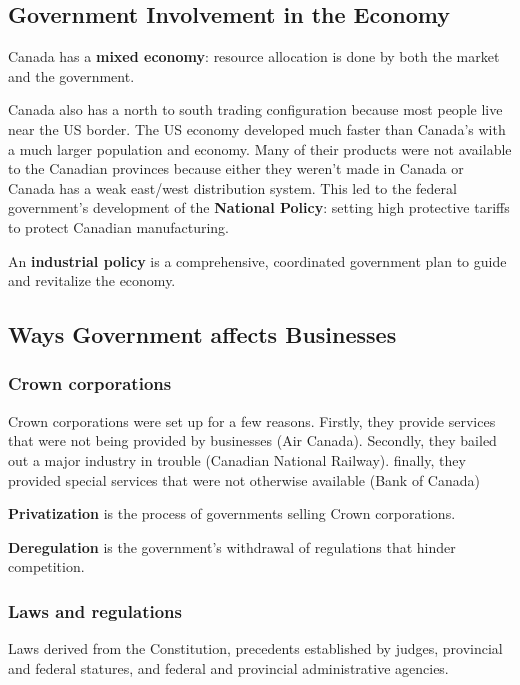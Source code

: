 \documentclass[english, 12pt]{article}
\begin{document}
\subsection{Government Involvement in the Economy}
\begin{defn}
Canada has a \textbf{mixed economy}: resource allocation is done by both the market and the government.
\end{defn}
\begin{defn}
Canada also has a north to south trading configuration because most people live near the US border.
The US economy developed much faster than Canada's with a much larger population and economy. 
Many of their products were not available to the Canadian provinces because either they weren't made in Canada or Canada has a weak east/west distribution system.
This led to the federal government's development of the \textbf{National Policy}: setting high protective tariffs to protect Canadian manufacturing.
\end{defn}
\begin{defn}
An \textbf{industrial policy} is a comprehensive, coordinated government plan to guide and revitalize the economy.
\end{defn}
\subsection{Ways Government affects Businesses}
\subsubsection{Crown corporations}
Crown corporations were set up for a few reasons. Firstly, they provide services that were not being provided by businesses (Air Canada). Secondly, they bailed out a major industry in trouble (Canadian National Railway). finally, they provided special services that were not otherwise available (Bank of Canada)
\begin{defn}
\textbf{Privatization} is the process of governments selling Crown corporations.
\end{defn}
\begin{defn}
\textbf{Deregulation} is the government's withdrawal of regulations that hinder competition.
\end{defn}
\subsubsection{Laws and regulations}
Laws derived from the Constitution, precedents established by judges, provincial and federal statures, and federal and provincial administrative agencies.
\end{document}
